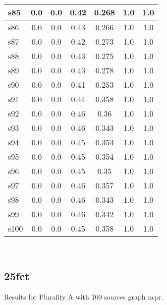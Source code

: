 \documentclass{article}
\begin{document}
\begin{tabular}{|l|c|c|c|c|c|c|}
\hline
s85 &0.0 & 0.0 & 0.42 & 0.268 & 1.0 & 1.0\\
\hline
s86 &0.0 & 0.0 & 0.43 & 0.266 & 1.0 & 1.0\\
\hline
s87 &0.0 & 0.0 & 0.42 & 0.273 & 1.0 & 1.0\\
\hline
s88 &0.0 & 0.0 & 0.43 & 0.275 & 1.0 & 1.0\\
\hline
s89 &0.0 & 0.0 & 0.43 & 0.278 & 1.0 & 1.0\\
\hline
s90 &0.0 & 0.0 & 0.41 & 0.253 & 1.0 & 1.0\\
\hline
s91 &0.0 & 0.0 & 0.44 & 0.358 & 1.0 & 1.0\\
\hline
s92 &0.0 & 0.0 & 0.46 & 0.36 & 1.0 & 1.0\\
\hline
s93 &0.0 & 0.0 & 0.46 & 0.343 & 1.0 & 1.0\\
\hline
s94 &0.0 & 0.0 & 0.45 & 0.353 & 1.0 & 1.0\\
\hline
s95 &0.0 & 0.0 & 0.45 & 0.354 & 1.0 & 1.0\\
\hline
s96 &0.0 & 0.0 & 0.45 & 0.35 & 1.0 & 1.0\\
\hline
s97 &0.0 & 0.0 & 0.46 & 0.357 & 1.0 & 1.0\\
\hline
s98 &0.0 & 0.0 & 0.46 & 0.343 & 1.0 & 1.0\\
\hline
s99 &0.0 & 0.0 & 0.46 & 0.342 & 1.0 & 1.0\\
\hline
s100 &0.0 & 0.0 & 0.45 & 0.358 & 1.0 & 1.0\\
\hline
\end{tabular}\\

\newpage

\subsection{25fct}

\noindent Results for Plurality A with 100 sources graph ncpr.
\end{document}
